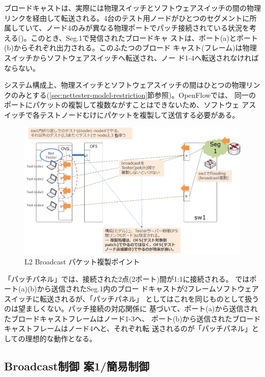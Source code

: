 ブロードキャストは、実際には物理スイッチとソフトウェアスイッチの間の物理
リンクを経由して転送される。4台のテスト用ノードがひとつのセグメントに所
属していて、ノード4のみが異なる物理ポートでパッチ接続されている状況を考
える()。このとき、Seg.1で発信されたブロードキャ
ストは、ポート(a)とポート(b)からそれぞれ出力される。このふたつのブロード
キャスト(フレーム)は物理スイッチからソフトウェアスイッチへ転送され、ノー
ド1-4へ転送されなければならない。

システム構成上、物理スイッチとソフトウェアスイッチの間はひとつの物理リン
クのみとする(\ref{sec:nettester-model-restriction}節参照)。OpenFlowでは、
同一のポートにパケットの複製して複数ながすことはできないため、ソフトウェ
アスイッチで各テストノードむけにパケットを複製して送信する必要がある。

\begin{figure}[h]
 \centering
 \includegraphics[scale=0.6]{img/l2bcctrl_req4.png}
 \caption{L2 Broadcast パケット複製ポイント}
 \label{fig:l2bcctrl_req4}
\end{figure}

「パッチパネル」では、接続された2点(2ポート)間が1:1に接続される。
ではポート(a)(b)から送信されたSeg.1内のブロー
ドキャストが2フレームソフトウェアスイッチに転送されるが、「パッチパネル」
としてはこれを同じものとして扱うのは望ましくない。パッチ接続の対応関係に
基づいて、ポート(a)から送信されたブロードキャストフレームはノード1-3へ、
ポート(b)から送信されたブロードキャストフレームはノード4へと、それぞれ転
送されるのが「パッチパネル」としての理想的な動作となる。

  \subsection{Broadcast制御 案1/簡易制御}
  \label{sec:l2bcctrl-plan1}

